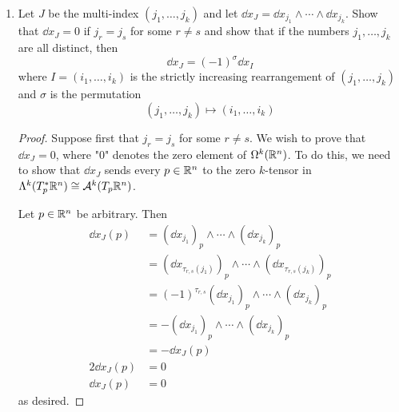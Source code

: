 \documentclass[../psets.tex]{subfiles}
\begin{document}
\begin{enumerate}[label={\textbf{2.3.\roman*.}}]
\begin{proof}
        Define $1/0=\pm\infty$ and $0\cdot\pm\infty=1$. Let $\omega=(1/x_1)\dd{x_2}\wedge\cdots\wedge\dd{x_n}$. Then
        \begin{align*}
            \mu\wedge\omega &= \left( \sum_{i=1}^nx_i\dd{x_i} \right)\wedge\left( \frac{1}{x_1}\dd{x_2}\wedge\cdots\wedge\dd{x_n} \right)\\
            &= \dd{x_1}\wedge\cdots\wedge\dd{x_n}
        \end{align*}
        where all terms save the first cancel by the anticommutative property.
    \end{proof}
    \item Let $J$ be the multi-index $(j_1,\dots,j_k)$ and let $\dd{x_J}=\dd{x_{j_1}}\wedge\cdots\wedge\dd{x_{j_k}}$. Show that $\dd{x_J}=0$ if $j_r=j_s$ for some $r\neq s$ and show that if the numbers $j_1,\dots,j_k$ are all distinct, then
    \begin{equation*}
        \dd{x_J} = (-1)^\sigma\dd{x_I}
    \end{equation*}
    where $I=(i_1,\dots,i_k)$ is the strictly increasing rearrangement of $(j_1,\dots,j_k)$ and $\sigma$ is the permutation
    \begin{equation*}
        (j_1,\dots,j_k) \mapsto (i_1,\dots,i_k)
    \end{equation*}
    \begin{proof}
        Suppose first that $j_r=j_s$ for some $r\neq s$. We wish to prove that $\dd{x_J}=0$, where "$0$" denotes the zero element of $\ome[k]{\R^n}$. To do this, we need to show that $\dd{x_J}$ sends every $p\in\R^n$ to the zero $k$-tensor in $\lam[k]{T_p^*\R^n}\cong\alt[k]{T_p\R^n}$.\par
        Let $p\in\R^n$ be arbitrary. Then
        \begin{align*}
            \dd{x_J}(p) &= (\dd{x_{j_1}})_p\wedge\cdots\wedge(\dd{x_{j_k}})_p\\
            &= (\dd{x_{\tau_{r,s}(j_1)}})_p\wedge\cdots\wedge(\dd{x_{\tau_{r,s}(j_k)}})_p\\
            &= (-1)^{\tau_{r,s}}(\dd{x_{j_1}})_p\wedge\cdots\wedge(\dd{x_{j_k}})_p\tag*{Claim 1.6.8}\\
            &= -(\dd{x_{j_1}})_p\wedge\cdots\wedge(\dd{x_{j_k}})_p\\
            &= -\dd{x_J}(p)\\
            2\dd{x_J}(p) &= 0\\
            \dd{x_J}(p) &= 0
        \end{align*}
        as desired.\par\smallskip

\end{proof}
\end{enumerate}
\end{document}
